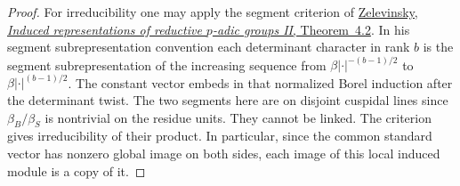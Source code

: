 \documentclass[a4paper,11pt]{article}
\theoremstyle{definition}
\theoremstyle{remark}
\numberwithin{equation}{section}
\begin{document}
\begin{proof}
For irreducibility one may apply the segment criterion of
\href{https://www.numdam.org/article/ASENS_1980_4_13_2_165_0.pdf}
{Zelevinsky, \emph{Induced representations of reductive
\(p\)-adic groups II}, Theorem~4.2}. In his segment
subrepresentation convention each determinant character in
rank \(b\) is the segment subrepresentation of the increasing
sequence from \(\beta|\cdot|^{-(b-1)/2}\) to
\(\beta|\cdot|^{(b-1)/2}\). The constant vector embeds in
that normalized Borel induction after the determinant twist.
The two segments here are on disjoint cuspidal lines since
\(\beta_B/\beta_S\) is nontrivial on the residue units.
They cannot be linked. The criterion gives irreducibility
of their product. In particular, since the common standard
vector has nonzero global image on both sides, each image
of this local induced module is a copy of it.
\end{proof}
\end{document}
